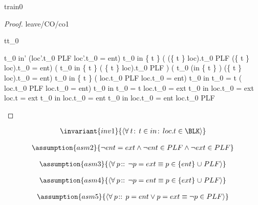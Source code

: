 \documentclass[12pt]{amsart}
\begin{document}
\begin{machine}{train0}
\begin{proof}{leave/CO/co1}
	\begin{free:var}{t}{t_0}
	\begin{calculation}
		t_0 \in in' \land (loc'.t_0 \in PLF \lor loc'.t_0 = ent)
		t_0 \in in \setminus \{ t \} 
		\land ( (\{ t \} \domsub loc).t_0 \in PLF \lor (\{ t \} \domsub loc).t_0 = ent)
	\hint{=}{ }	%
		( t_0 \in in \setminus \{ t \} 
		\land  ( \{ t \} \domsub loc).t_0 \in PLF )
			   \lor ( t_0 \in (in \setminus \{ t \} )
		\land (\{ t \} \domsub loc).t_0 = ent)
	\hint{=}{ \ref{inv2} }	%
			t_0 \in in \setminus \{ t \} 
		\land ( loc.t_0 \in PLF \lor  loc.t_0 = ent)
	\hint{=}{ } %
		t_0 \in in \land \neg t_0  = t 
		\land ( loc.t_0 \in PLF \lor  loc.t_0 = ent)
	\hint{=}{  } %
		t_0 \in in \land \neg t_0  = t \land \neg loc.t_0 = ext
	\hint{=}{  \ref{grd0} } %
	 	t_0 \in in \land \neg loc.t_0 = ext \land loc.t = ext
	\hint{\follows}{  \ref{grd0} } %
	 	t_0 \in in \land loc.t_0 = ent 
	\hint{=}{   } %
	 	t_0 \in in \land loc.t_0 = ent  \land \neg loc.t_0 \in PLF 
	\end{calculation}
	\end{free:var}
\end{proof}

\begin{align*}
\invariant{inv1}
{	\qforall{t}{t \in in}{loc.t \in \BLK}	}
\end{align*}

\begin{align*}
\assumption{asm2}
{	\neg ent = ext \land \neg ent \in PLF \land \neg ext \in PLF	}
\end{align*}

\begin{align*}
\assumption{asm3}
{	\qforall{p}{}{ \neg p = ext \equiv p \in \{ent\} \bunion PLF }	}
\end{align*}

\begin{align*}
\assumption{asm4}
{	\qforall{p}{}{ \neg p = ent \equiv p \in \{ext\} \bunion PLF }	}
\end{align*}

\begin{align*}
\assumption{asm5}
{	\qforall{p}{}{ p = ent \lor p = ext \equiv \neg p \in PLF }	}
\end{align*}

\end{machine}
\end{document}
